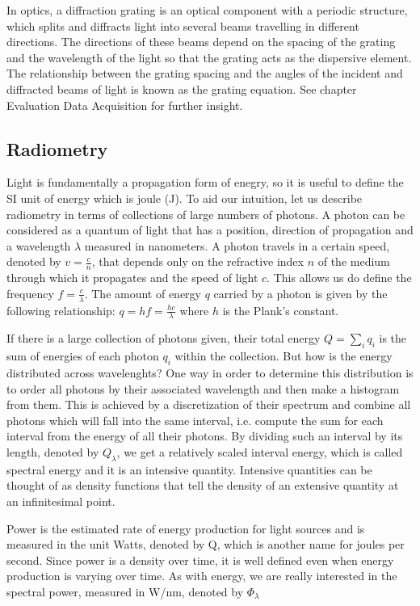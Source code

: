 In optics, a diffraction grating is an optical component with a periodic structure, which splits and diffracts light into several beams travelling in different directions. The directions of these beams depend on the spacing of the grating and the wavelength of the light so that the grating acts as the dispersive element.
The relationship between the grating spacing and the angles of the incident and diffracted beams of light is known as the grating equation. See chapter Evaluation Data Acquisition for further insight.

\subsection{Radiometry}
Light is fundamentally a propagation form of enegry, so it is useful to define the SI unit of energy which is joule (J). To aid our intuition, let us describe radiometry in terms of collections of large numbers of photons. A photon can be considered as a quantum of light that has a position, direction of propagation and a wavelength $\lambda$ measured in nanometers. A photon travels in a certain speed, denoted by $v = \frac{c}{n}$, that depends only on the refractive index $n$ of the medium through which it propagates and the speed of light $c$. This allows us do define the frequency $f = \frac{c}{\lambda}$. The amount of energy $q$ carried by a photon is given by the following relationship: $q = hf= \frac{hc}{\lambda}$ where $h$ is the Plank's constant.

If there is a large collection of photons given, their total energy $Q = \sum_i q_i$ is the sum of energies of each photon $q_i$ within the collection. But how is the energy distributed across wavelenghts? One way in order to determine this distribution is to order all photons by their associated wavelength and then make a histogram from them. This is achieved by a discretization of their spectrum and combine all photons which will fall into the same interval, i.e. compute the sum for each interval from the energy of all their photons. By dividing such an interval by its length, denoted by $Q_\lambda$, we get a relatively scaled interval energy, which is called spectral energy and it is an intensive quantity. Intensive quantities can be thought of as density functions that tell the density of an extensive quantity at an infinitesimal point.

Power is the estimated rate of energy production for light sources and is measured in the unit Watts, denoted by Q, which is another name for joules per second. Since power is a density over time, it is well defined even when energy production is varying over time. As with energy, we are really interested in the spectral power, measured in W/nm, denoted by $\Phi_\lambda$

